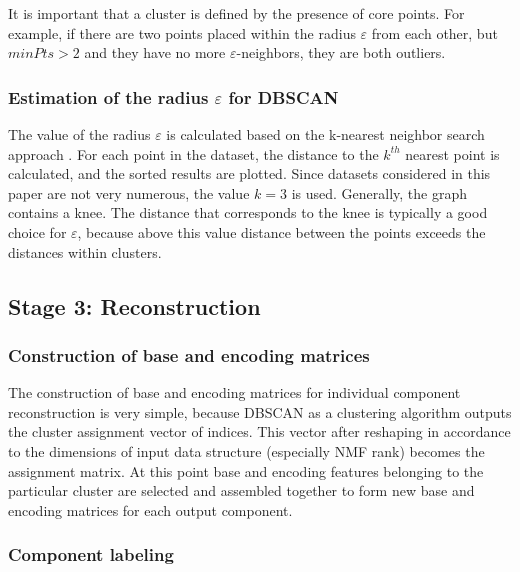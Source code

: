 \documentclass[3p,times]{elsarticle}
\begin{document}
It is important that a cluster is defined by the presence of core points. For example, if there are two points placed within the radius $\varepsilon$ from each other, but $minPts>2$ and they have no more $\varepsilon$-neighbors, they are both outliers.


\subsubsection{Estimation of the radius $\varepsilon$ for DBSCAN}

The value of the radius $\varepsilon$ is calculated based on the k-nearest neighbor search approach \cite{rahmah2016determination,elbatta2012improvement}. For each point in the dataset, the distance to the $k^{th}$ nearest point is calculated, and the sorted results are plotted. Since datasets considered in this paper are not very numerous, the value $k=3$ is used. Generally, the graph contains a knee. The distance that corresponds to the knee is typically a good choice for $\varepsilon$, because above this value distance between the points exceeds the distances within clusters.

\subsection{Stage 3: Reconstruction}

\subsubsection{Construction of base and encoding matrices}\label{s:rec}

The construction of base and encoding matrices for individual component reconstruction is very simple, because DBSCAN as a clustering algorithm outputs the cluster assignment vector of indices. This vector after reshaping in accordance to the dimensions of input data structure (especially NMF rank) becomes the assignment matrix. At this point base and encoding features belonging to the particular cluster are selected and assembled together to form new base and encoding matrices for each output component. 



\subsubsection{Component labeling}
\end{document}
